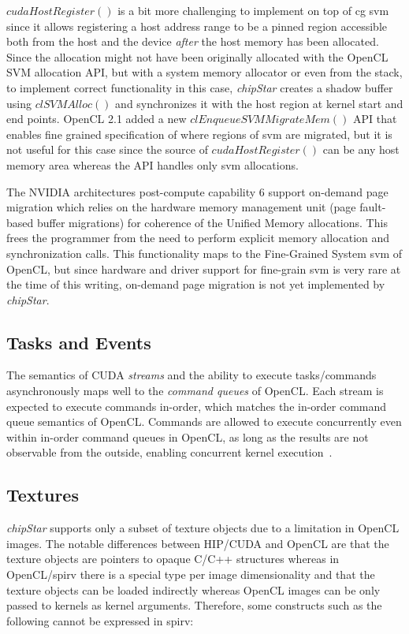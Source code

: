 \documentclass[Afour,sageh,times]{sagej}
\newcommand{\chipstar}{\textit{chipStar}\xspace}
\newcommand{\func}[1]{$#1$\xspace}
\newcommand{\mycite}[1]{\citep{#1}}
\begin{document}
\func{cudaHostRegister()} is a bit more challenging to implement on top of \gls{cg} \gls{svm} since it
allows registering a host address range to be a pinned region accessible both from the host and
the device \textit{after}
the host memory has been allocated. Since the allocation might not have
been originally allocated with the OpenCL SVM allocation API, but with a system memory allocator or even
from the stack, to implement correct functionality in this case, \chipstar creates
a shadow buffer using \func{clSVMAlloc()} and synchronizes it with the host region at
kernel start and end points. OpenCL 2.1 added a new \func{clEnqueueSVMMigrateMem()} API that enables fine grained specification of where regions of \gls{svm} are migrated, but it is not useful for this case since the source of \func{cudaHostRegister()} can be any host memory area whereas the API handles only \gls{svm} allocations.

The NVIDIA architectures post-compute capability 6 support on-demand page migration which
relies on the hardware memory management unit (page fault-based buffer migrations) for coherence
of the Unified Memory allocations. This frees the programmer from the need to perform explicit memory allocation and synchronization calls. This functionality maps to the Fine-Grained System \gls{svm} of OpenCL, but since hardware and driver support for fine-grain \gls{svm} is very rare at the time of this writing, on-demand page migration is not yet implemented by \chipstar.

\subsection{Tasks and Events}

The semantics of CUDA \textit{streams} and the ability to execute tasks/commands
asynchronously maps well to the \textit{command queues} of OpenCL. Each stream is expected
to execute commands in-order, which matches the in-order command queue semantics of OpenCL.
Commands are allowed to execute concurrently even within in-order command queues in OpenCL,
as long as the results are not observable from the outside, enabling concurrent kernel
execution~\mycite{OpenCL}.

\subsection{Textures}

\chipstar supports only a subset of texture objects due to a limitation in OpenCL images. The notable differences between HIP/CUDA and OpenCL are that the texture objects are pointers to opaque C/C++ structures whereas in OpenCL/\gls{spirv} there is a special type per image dimensionality and that the texture objects can be loaded indirectly whereas OpenCL images can be only passed to kernels as kernel arguments. Therefore, some constructs such as the following cannot be expressed in \gls{spirv}:
\end{document}
